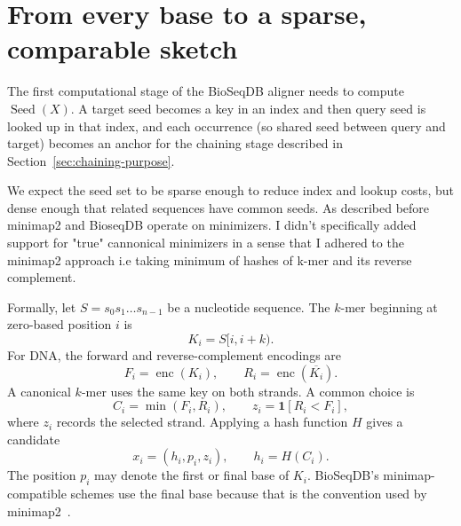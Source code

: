 

\raggedbottom

\section{From every base to a sparse, comparable sketch}
\label{sec:minimizers-role}

The first computational stage of the BioSeqDB aligner needs to compute
\(\operatorname{Seed}(X)\).
A target seed becomes a key in an index and then query seed is looked
up in that index, and each occurrence (so shared seed between query and target) becomes an anchor for the
chaining stage described in Section~\ref{sec:chaining-purpose}. 

We expect the seed set to be sparse enough to reduce index and lookup costs, but dense enough that related sequences have common seeds.
As described before minimap2 and BioseqDB operate on minimizers. I didn't specifically added support for "true" cannonical minimizers in a sense that I 
adhered to the minimap2 approach i.e taking minimum of hashes of k-mer and its reverse complement.

Formally, let $S=s_0s_1\ldots s_{n-1}$ be a nucleotide sequence. The $k$-mer beginning
at zero-based position $i$ is
\[
  K_i=S[i,i+k).
\]
For DNA, the forward and reverse-complement encodings are
\[
  F_i=\operatorname{enc}(K_i),
  \qquad
  R_i=\operatorname{enc}(\overline{K_i}).
\]
A canonical $k$-mer uses the same key on both strands. A common choice is
\[
  C_i=\min(F_i,R_i),
  \qquad
  z_i=\mathbf{1}[R_i<F_i],
\]
where $z_i$ records the selected strand. Applying a hash function $H$ gives a
candidate
\[
  x_i=(h_i,p_i,z_i),
  \qquad
  h_i=H(C_i).
\]
The position $p_i$ may denote the first or final base of $K_i$. BioSeqDB's
minimap-compatible schemes use the final base because that is the convention
used by minimap2~\cite{minimap2_paper}.

